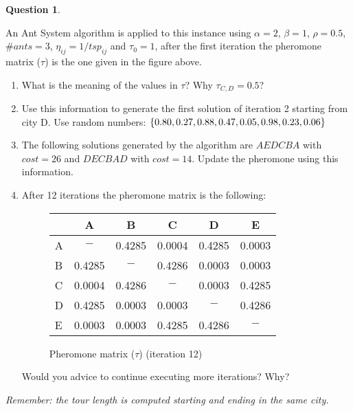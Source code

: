 \documentclass[11pt,a4paper]{article}
\theoremstyle{definition}%
\newtheorem{Q}{Question}[] %
\begin{document}
\begin{Q}
\begin{enumerate}
   An Ant System algorithm is applied to this instance using $\alpha=2$, $\beta=1$, $\rho=0.5$, $\#ants=3$, $\eta_{ij}=1/tsp_{ij}$ and $\tau_0=1$, after the first iteration the pheromone matrix ($\tau$) is the one given in the figure above. 
   \begin{enumerate}
     \item What is the meaning of the values in $\tau$? Why $\tau_{C,D}=0.5$?
     \item Use this information to generate the first solution of 
     iteration 2 starting from city D. Use random numbers: $\{0.80, 
     0.27, 0.88, 0.47, 0.05, \\0.98, 0.23, 0.06 \}$
     \item The following solutions generated by the algorithm  are $AEDCBA$ with $cost=26$ and $DECBAD$ with $cost=14$. Update the pheromone using this information.
     \item After 12 iterations the pheromone matrix is the following:
        \begin{figure}[ht]
           \centering
           \begin{tabular} {| l | c |c | c | c | c |}
            \hline
                &  A  &  B  &  C  &  D  & E   \\
            \hline
              A & $-$     &  0.4285  &  0.0004  &  0.4285  & 0.0003   \\
              B &  0.4285 & $-$      &  0.4286  &  0.0003  & 0.0003  \\  
              C &  0.0004 &  0.4286  & $-$      &  0.0003  & 0.4285   \\
              D &  0.4285 &  0.0003  &  0.0003  & $-$      & 0.4286   \\
              E &  0.0003 &  0.0003  &  0.4285  &  0.4286  & $-$  \\
            \hline
            \end{tabular}
            \caption{Pheromone matrix ($\tau$) (iteration 12)}
        \end{figure}
         
         Would you advice to continue executing more iterations? Why?
   \end{enumerate}
 \textit{Remember: the tour length is computed starting and ending in the same city.}
  
 \end{enumerate}
 \end{Q}
\end{document}
